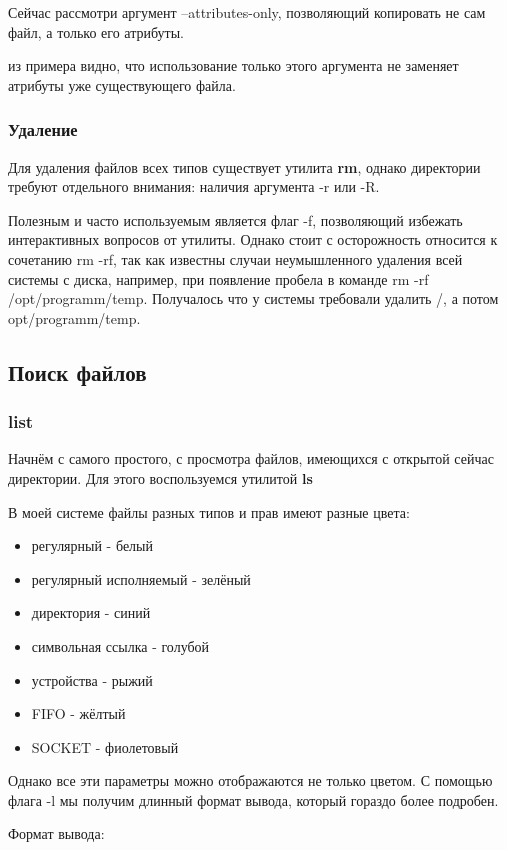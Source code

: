 \documentclass[a4paper]{article}
\begin{document}
Сейчас рассмотри аргумент --attributes-only, позволяющий копировать не сам файл, а только его атрибуты.

из примера видно, что использование только этого аргумента не заменяет атрибуты уже существующего файла.
\subsubsection{ Удаление}
Для удаления файлов всех типов существует утилита \textbf{rm}, однако директории требуют отдельного внимания: наличия аргумента -r или -R.

Полезным и часто используемым является флаг -f, позволяющий избежать интерактивных вопросов от утилиты. Однако стоит с осторожность относится к сочетанию rm -rf, так как известны случаи неумышленного удаления всей системы с диска, например, при появление пробела в команде rm -rf /opt/programm/temp. Получалось что у системы требовали удалить /, а потом opt/programm/temp.

\subsection{ Поиск файлов}
\subsubsection{ list}
\label{list}
Начнём с самого простого, с просмотра файлов, имеющихся с открытой сейчас директории. Для этого воспользуемся утилитой \textbf{ls}

В моей системе файлы разных типов и прав имеют разные цвета:
\begin{itemize}
\item регулярный - белый
\item регулярный исполняемый - зелёный
\item директория - синий
\item символьная ссылка - голубой
\item устройства - рыжий
\item FIFO - жёлтый
\item SOCKET - фиолетовый
\end{itemize}
Однако все эти параметры можно отображаются не только цветом. С помощью флага -l мы получим длинный формат вывода, который гораздо более подробен.

Формат вывода:
\end{document}
